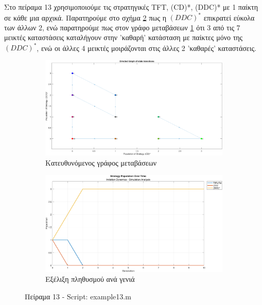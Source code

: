 \documentclass[12pt]{report}
\begin{document}
Στο πείραμα 13 χρησιμοποιούμε τις στρατηγικές \foreignlanguage{english}{TFT, (CD)*, (DDC)*} με 1 παίκτη σε κάθε μια αρχικά. Παρατηρούμε στο σχήμα \ref{fig:fig13-sim} πως η $(DDC)^*$ επικρατεί εύκολα των άλλων 2, ενώ παρατηρούμε πως στον γράφο μεταβάσεων \ref{fig:fig13} ότι 3 από τις 7 μεικτές καταστάσεις καταλήγουν στην 'καθαρή' κατάσταση με παίκτες μόνο της $(DDC)^*$, ενώ οι άλλες 4 μεικτές μοιράζονται στις άλλες 2 'καθαρές' καταστάσεις.
\begin{figure}[H]
    \centering

    \begin{subfigure}[b]{0.45\textwidth}
        \includegraphics[width=\linewidth]{Figures Imitation Dynamics/example13.png}
        \caption{Κατευθυνόμενος γράφος μεταβάσεων}
        \label{fig:fig13}
    \end{subfigure}
    \hfill
    \begin{subfigure}[b]{0.45\textwidth}
        \includegraphics[width=\linewidth]{Figures Imitation Dynamics/example13-sim.png}
        \caption{Εξέλιξη πληθυσμού ανά γενιά}
        \label{fig:fig13-sim}
    \end{subfigure}

    \caption{Πείραμα 13 - \foreignlanguage{english}{Script: example13.m}}
    \label{fig:example13}
\end{figure}
\end{document}
